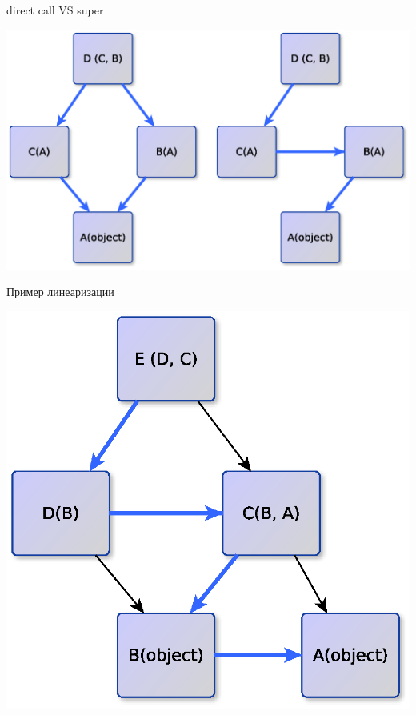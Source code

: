 \documentclass{article}
\begin{document}
\begin{center}direct call VS super\end{center}
\begin{center} \includegraphics{images/linearization_simple.eps} \end{center} 
\newpage

\begin{center}Пример линеаризации\end{center}
\begin{center} \includegraphics{images/inheritance_1.eps} \end{center} 
\newpage
\end{document}
